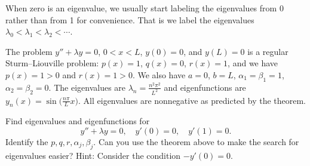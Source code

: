 When zero
is an eigenvalue, we usually
start labeling the eigenvalues from 0 rather than from 1 for convenience.
That is we label the eigenvalues $\lambda_0 < \lambda_1 < \lambda_2 < \cdots$.

\begin{example}
The problem $y''+\lambda y=0$, $0 < x < L$, $y(0) = 0$, and $y(L) = 0$
is a regular Sturm--Liouville problem:  $p(x) = 1$, $q(x) = 0$, $r(x) = 1$,
and we have $p(x) = 1 > 0$ and $r(x) = 1 > 0$.  We also have
$a=0$, $b=L$, $\alpha_1 = \beta_1 = 1$, $\alpha_2 = \beta_2 = 0$.
The eigenvalues are $\lambda_n = \frac{n^2 \pi^2}{L^2}$ and eigenfunctions
are $y_n(x) = \sin\bigl(\frac{n\pi}{L} x\bigr)$.  All eigenvalues are nonnegative as
predicted by the theorem.
\end{example}

\begin{exercise}
Find eigenvalues and eigenfunctions for
\begin{equation*}
y'' + \lambda y = 0, \quad y'(0) = 0, \quad y'(1) = 0.
\end{equation*}
Identify
the $p, q, r, \alpha_j, \beta_j$.
Can you use the theorem above to make the search for eigenvalues easier?
Hint: Consider the condition $-y'(0)=0$.
\end{exercise}

